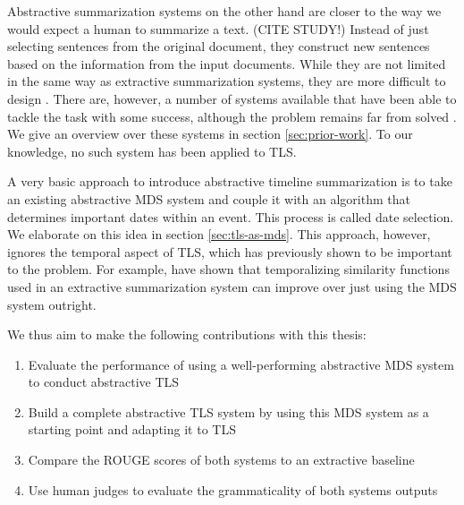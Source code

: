 \documentclass[a4paper,BCOR=10mm]{report}
\numberwithin{lemma}{chapter}
\numberwithin{definition}{chapter}
\begin{document}
Abstractive summarization systems on the other hand are closer to the way we would expect a human to summarize a text. (CITE STUDY!) Instead of just selecting sentences from the original document, they construct new sentences based on the information from the input documents. While they are not limited in the same way as extractive summarization systems, they are more difficult to design \citep{recent-advances, a-brief-survey}.
There are, however, a number of systems available that have been able to tackle the task with some success, although the problem remains far from solved \citep{recent-advances}. We give an overview over these systems in section \ref{sec:prior-work}.
To our knowledge, no such system has been applied to TLS.


A very basic approach to introduce abstractive timeline summarization is to take an existing abstractive MDS system and couple it with an algorithm that determines important dates within an event. This process is called date selection. We elaborate on this idea in section \ref{sec:tls-as-mds}. This approach, however, ignores the temporal aspect of TLS, which has previously shown to be important to the problem. For example, \citet{markert} have shown that temporalizing similarity functions used in an extractive summarization system can improve over just using the MDS system outright.

We thus aim to make the following contributions with this thesis:

\begin{enumerate}
\item{Evaluate the performance of using a well-performing abstractive MDS system to conduct abstractive TLS}
\item{Build a complete abstractive TLS system by using this MDS system as a starting point and adapting it to TLS}
\item{Compare the ROUGE scores of both systems to an extractive baseline}
\item{Use human judges to evaluate the grammaticality of both systems outputs}
\end{enumerate}
\end{document}
